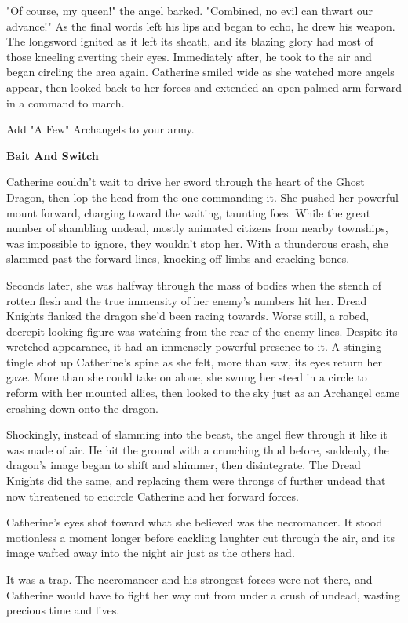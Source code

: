 \begin{multicols*}{2}
"Of course, my queen!" the angel barked. "Combined, no evil can thwart our advance!" As the final words left his lips and began to echo, he drew his weapon. The longsword ignited as it left its sheath, and its blazing glory had most of those kneeling averting their eyes. Immediately after, he took to the air and began circling the area again. Catherine smiled wide as she watched more angels appear, then looked back to her forces and extended an open palmed arm forward in a command to march.

\textcolor{darkcandyapplered}{Add "A Few" Archangels to your army.}

\textbf{Bait And Switch}

Catherine couldn't wait to drive her sword through the heart of the Ghost Dragon, then lop the head from the one commanding it. She pushed her powerful mount forward, charging toward the waiting, taunting foes. While the great number of shambling undead, mostly animated citizens from nearby townships, was impossible to ignore, they wouldn't stop her. With a thunderous crash, she slammed past the forward lines, knocking off limbs and cracking bones.

Seconds later, she was halfway through the mass of bodies when the stench of rotten flesh and the true immensity of her enemy's numbers hit her. Dread Knights flanked the dragon she'd been racing towards. Worse still, a robed, decrepit-looking figure was watching from the rear of the enemy lines. Despite its wretched appearance, it had an immensely powerful presence to it. A stinging tingle shot up Catherine's spine as she felt, more than saw, its eyes return her gaze. More than she could take on alone, she swung her steed in a circle to reform with her mounted allies, then looked to the sky just as an Archangel came crashing down onto the dragon.

Shockingly, instead of slamming into the beast, the angel flew through it like it was made of air. He hit the ground with a crunching thud before, suddenly, the dragon's image began to shift and shimmer, then disintegrate. The Dread Knights did the same, and replacing them were throngs of further undead that now threatened to encircle Catherine and her forward forces.

Catherine's eyes shot toward what she believed was the necromancer. It stood motionless a moment longer before cackling laughter cut through the air, and its image wafted away into the night air just as the others had.

It was a trap. The necromancer and his strongest forces were not there, and Catherine would have to fight her way out from under a crush of undead, wasting precious time and lives.


\end{multicols*}
